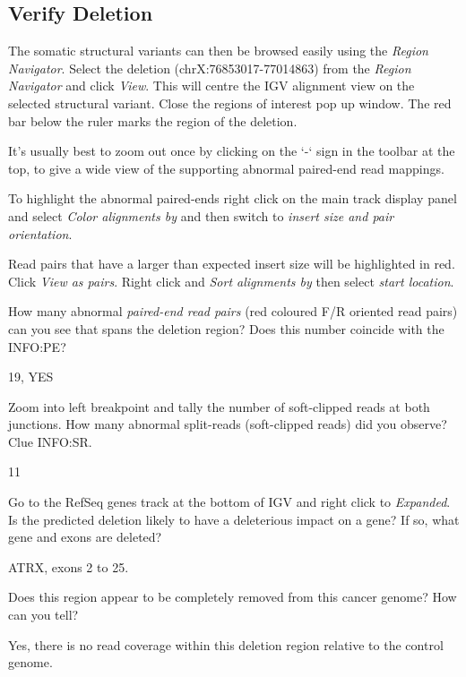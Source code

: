 \subsection{Verify Deletion}
\begin{advanced}

\begin{steps}
The somatic structural variants can then be browsed easily using the \emph{Region Navigator}.  Select the deletion (chrX:76853017-77014863) from the \emph{Region Navigator} and click \emph{View}. This will centre the IGV alignment view on the selected structural variant. Close the regions of interest pop up window. The red bar below the ruler marks the region of the deletion.

It’s usually best to zoom out once by clicking on the ‘-‘ sign in the toolbar at the top, to give a wide view of the supporting abnormal paired-end read mappings. 

To highlight the abnormal paired-ends right click on the main track display panel and select \emph{Color alignments by} and then switch to \emph{insert size and pair orientation}.

Read pairs that have a larger than expected insert size will be highlighted in red. Click \emph{View as pairs}. Right click and \emph{Sort alignments by} then select \emph{start location}.

\end{steps}
\end{advanced}


\begin{questions}
How many abnormal \emph{paired-end read pairs} (red coloured F/R oriented read pairs) can you see that spans the deletion region? Does this number coincide with the INFO:PE? 
\begin{answer}
19, YES
\end{answer}
Zoom into left breakpoint and tally the number of soft-clipped reads at both junctions.
How many abnormal split-reads (soft-clipped reads) did you observe? Clue INFO:SR.
\begin{answer}
11
\end{answer}
Go to the RefSeq genes track at the bottom of IGV and right click to \emph{Expanded}.
Is the predicted deletion likely to have a deleterious impact on a gene? If so, what gene and exons are deleted?
\begin{answer}
ATRX, exons 2 to 25.
\end{answer}
Does this region appear to be completely removed from this cancer genome? How can you tell?
\begin{answer}
Yes, there is no read coverage within this deletion region relative to the control genome. 
\end{answer}
\end{questions}



